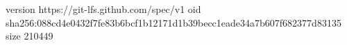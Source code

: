 version https://git-lfs.github.com/spec/v1
oid sha256:088cd4e0432f7fe83b6bcf1b12171d1b39becc1eade34a7b607f682377d83135
size 210449
